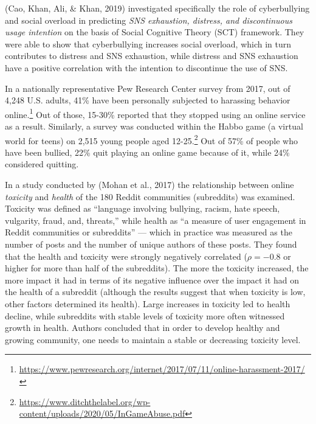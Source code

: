 \documentclass[
  10pt,
  dvipsnames]{scrartcl}
\begin{document}
(Cao, Khan, Ali, \& Khan, 2019) investigated specifically the role of
cyberbullying and social overload in predicting
\textit{SNS exhaustion, distress, and discontinuous usage intention} on
the basis of Social Cognitive Theory (SCT) framework. They were able to
show that cyberbullying increases social overload, which in turn
contributes to distress and SNS exhaustion, while distress and SNS
exhaustion have a positive correlation with the intention to discontinue
the use of SNS.

In a nationally representative Pew Research Center survey from 2017, out
of 4,248 U.S. adults, 41\% have been personally subjected to harassing
behavior
online.\footnote{\url{https://www.pewresearch.org/internet/2017/07/11/online-harassment-2017/}}
Out of those, 15-30\% reported that they stopped using an online service
as a result. Similarly, a survey was conducted within the Habbo game (a
virtual world for teens) on 2,515 young people aged
12-25.\footnote{\url{https://www.ditchthelabel.org/wp-content/uploads/2020/05/InGameAbuse.pdf}}
Out of 57\% of people who have been bullied, 22\% quit playing an online
game because of it, while 24\% considered quitting.

In a study conducted by (Mohan et al., 2017) the relationship between
online \emph{toxicity} and \emph{health} of the 180 Reddit communities
(subreddits) was examined. Toxicity was defined as ``language involving
bullying, racism, hate speech, vulgarity, fraud, and, threats,'' while
health as ``a measure of user engagement in Reddit communities or
subreddits'' --- which in practice was measured as the number of posts
and the number of unique authors of these posts. They found that the
health and toxicity were strongly negatively correlated (\(\rho=-0.8\)
or higher for more than half of the subreddits). The more the toxicity
increased, the more impact it had in terms of its negative influence
over the impact it had on the health of a subreddit (although the
results suggest that when toxicity is low, other factors determined its
health). Large increases in toxicity led to health decline, while
subreddits with stable levels of toxicity more often witnessed growth in
health. Authors concluded that in order to develop healthy and growing
community, one needs to maintain a stable or decreasing toxicity level.
\end{document}
